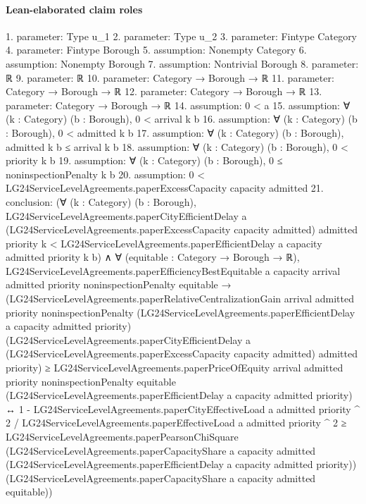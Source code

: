 \documentclass[10pt]{article}
\begin{document}
\paragraph{Lean-elaborated claim roles}\begin{ReviewVerbatim}
1. parameter: Type u_1
2. parameter: Type u_2
3. parameter: Fintype Category
4. parameter: Fintype Borough
5. assumption: Nonempty Category
6. assumption: Nonempty Borough
7. assumption: Nontrivial Borough
8. parameter: ℝ
9. parameter: ℝ
10. parameter: Category → Borough → ℝ
11. parameter: Category → Borough → ℝ
12. parameter: Category → Borough → ℝ
13. parameter: Category → Borough → ℝ
14. assumption: 0 < a
15. assumption: ∀ (k : Category) (b : Borough), 0 < arrival k b
16. assumption: ∀ (k : Category) (b : Borough), 0 < admitted k b
17. assumption: ∀ (k : Category) (b : Borough), admitted k b ≤ arrival k b
18. assumption: ∀ (k : Category) (b : Borough), 0 < priority k b
19. assumption: ∀ (k : Category) (b : Borough), 0 ≤ noninspectionPenalty k b
20. assumption: 0 < LG24ServiceLevelAgreements.paperExcessCapacity capacity admitted
21. conclusion: (∀ (k : Category) (b : Borough),
    LG24ServiceLevelAgreements.paperCityEfficientDelay a
        (LG24ServiceLevelAgreements.paperExcessCapacity capacity admitted) admitted priority k <
      LG24ServiceLevelAgreements.paperEfficientDelay a capacity admitted priority k b) ∧
  ∀ (equitable : Category → Borough → ℝ),
    LG24ServiceLevelAgreements.paperEfficiencyBestEquitable a capacity arrival admitted priority noninspectionPenalty
        equitable →
      (LG24ServiceLevelAgreements.paperRelativeCentralizationGain arrival admitted priority noninspectionPenalty
            (LG24ServiceLevelAgreements.paperEfficientDelay a capacity admitted priority)
            (LG24ServiceLevelAgreements.paperCityEfficientDelay a
              (LG24ServiceLevelAgreements.paperExcessCapacity capacity admitted) admitted priority) ≥
          LG24ServiceLevelAgreements.paperPriceOfEquity arrival admitted priority noninspectionPenalty equitable
            (LG24ServiceLevelAgreements.paperEfficientDelay a capacity admitted priority) ↔
        1 -
            LG24ServiceLevelAgreements.paperCityEffectiveLoad a admitted priority ^ 2 /
              LG24ServiceLevelAgreements.paperEffectiveLoad a admitted priority ^ 2 ≥
          LG24ServiceLevelAgreements.paperPearsonChiSquare
            (LG24ServiceLevelAgreements.paperCapacityShare a capacity admitted
              (LG24ServiceLevelAgreements.paperEfficientDelay a capacity admitted priority))
            (LG24ServiceLevelAgreements.paperCapacityShare a capacity admitted equitable))
\end{ReviewVerbatim}
\end{document}
